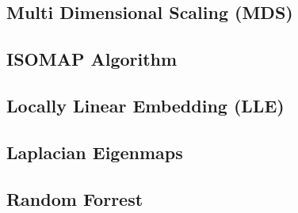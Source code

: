 \subsection*{Multi Dimensional Scaling (MDS)}
\subsection*{ISOMAP Algorithm}
\subsection*{Locally Linear Embedding (LLE)}
\subsection*{Laplacian Eigenmaps}
\subsection*{Random Forrest}


%
%
%
%
%
%
